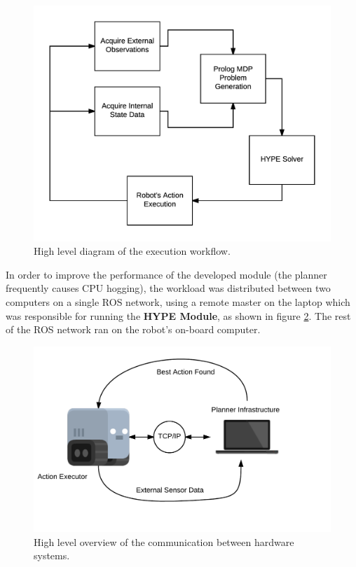 \begin{figure}[H]
    \centering
        \includegraphics[scale=0.7]{images/workflow}
        \caption{High level diagram of the execution workflow.}
        \label{fig:software_workflow}
\end{figure}

In order to improve the performance of the developed module
(the planner frequently causes CPU hogging), the workload was distributed between two 
computers on a single ROS network, using a remote master on the laptop which was responsible 
for running the \textbf{HYPE Module}, as shown in figure \ref{fig:hardware_communication}. 
The rest of the ROS network ran on the robot's on-board computer. 

\begin{figure}[H]
    \centering
        \includegraphics[scale=0.19]{images/communication}
        \caption{High level overview of the communication between hardware
        systems.}
        \label{fig:hardware_communication}
\end{figure}
